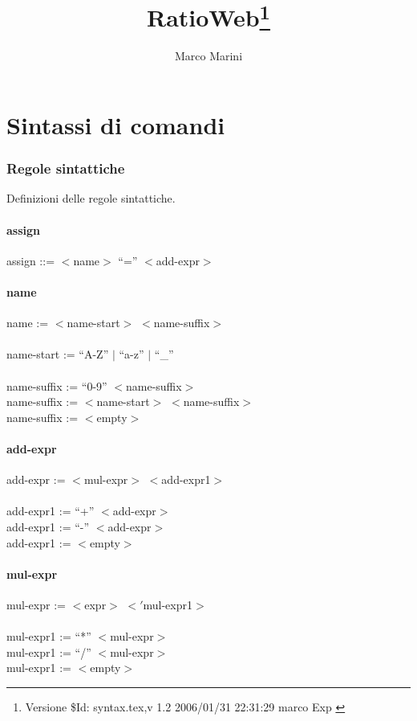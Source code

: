 \documentclass{article}
\begin{document}
  \title{RatioWeb\thanks{Versione \$Id: syntax.tex,v 1.2 2006/01/31 22:31:29 marco Exp $ $}}
  \author{Marco Marini}
  \maketitle
  \part{Sintassi di comandi}
  \section{Regole sintattiche}
  Definizioni delle regole sintattiche.
  
  \subsection{assign}
  assign ::= $<$name$>$ ``='' $<$add-expr$>$
 
  \subsection{name}
  name := $<$name-start$>$ $<$name-suffix$>$
  \\
  \\
  name-start := ``A-Z'' $|$ ``a-z'' $|$ ``\_''
  \\
  \\
  name-suffix := ``0-9'' $<$name-suffix$>$
  \\
  name-suffix := $<$name-start$>$ $<$name-suffix$>$
  \\
  name-suffix := $<$empty$>$
  
  \subsection{add-expr}
  add-expr := $<$mul-expr$>$ $<$add-expr1$>$
  \\
  \\
  add-expr1 := ``+'' $<$add-expr$>$
  \\
  add-expr1 := ``-'' $<$add-expr$>$
  \\
  add-expr1 := $<$empty$>$

  \subsection{mul-expr}
  mul-expr := $<$expr$>$ $<'$mul-expr1$>$
  \\
  \\
  mul-expr1 := ``*'' $<$mul-expr$>$
  \\
  mul-expr1 := ``/'' $<$mul-expr$>$
  \\
  mul-expr1 := $<$empty$>$
 
\end{document}
